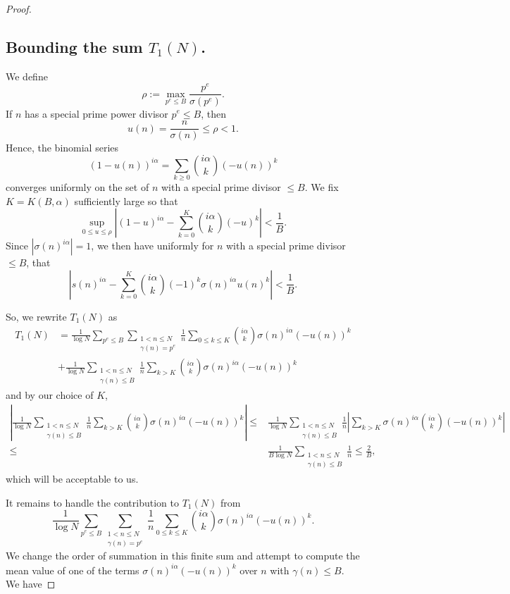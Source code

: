 \documentclass[11pt, reqno]{amsart}
\theoremstyle{remark}
\numberwithin{theorem}{section}
\numberwithin{proposition}{section}
\numberwithin{lemma}{section}
\numberwithin{corollary}{section}
\numberwithin{equation}{section}
\numberwithin{conjecture}{section}
\numberwithin{definition}{section}
\begin{document}
\begin{proof}
\subsection{Bounding the sum $T_1 (N)$.}

 We define
$$\rho := \max_{p^e\le B}
\frac{p^e}{\sigma(p^e)}.$$
If $n$ has a special prime power divisor $p^e\le B$, then $$u(n) = \frac{n}{\sigma(n)} \leq \rho < 1.$$ Hence, the binomial series $$(1 - u(n))^{i\alpha} = \sum_{k \geq 0} \binom{i\alpha}{k}(-u(n))^k$$ converges uniformly on the set of $n$ with a special prime divisor $\le B$. We fix $K = K(B, \alpha)$ sufficiently large so that $$\sup_{0\leq u \leq \rho}\left |(1 - u)^{i\alpha} - \sum_{k=0}^K \binom{i\alpha}{k}(-u)^k\right| < \frac{1}{B}.$$ Since $|\sigma(n)^{i\alpha}| =1$, we then have uniformly for $n$ with a special prime divisor $\le B$, that $$\left|s(n)^{i\alpha} - \sum_{k = 0}^K \binom{i\alpha}{k}(-1)^k\sigma(n)^{i\alpha}u(n)^k\right| < \frac{1}{B}.$$ 

So, we rewrite $T_1(N)$ as 
\begin{align*}
 T_1 (N)&= \frac{1}{\log N}\sum_{p^e\leq B}\sum_{\substack{1<n\leq N\\
 \gamma (n)=p^e }}\frac{1}{n}\sum_{0\leq k \leq K} \binom{i\alpha}{k}\sigma(n)^{i\alpha} (-u(n))^{k} \\&+ \frac{1}{\log N}\sum_{\substack{1<n\leq N\\
 \gamma (n)\le B }}\frac{1}{n}\sum_{k > K} \binom{i\alpha}{k}\sigma(n)^{i\alpha} (-u(n))^{k}
    \end{align*}
and by our choice of $K$,
\begin{align*}
   \left|\frac{1}{\log{N}}\sum_{\substack{1<n\leq N\\
   \gamma (n)\leqslant B}}\frac{1}{n}\sum_{k > K} \binom{i\alpha}{k}\sigma(n)^{i\alpha} (-u(n))^{k}\right|\leq& \frac{1}{\log{N}} \sum_{\substack{1<n\leq N\\
   \gamma (n)\leqslant B}}\frac{1}{n}\left|\sum_{k > K} \sigma(n)^{i\alpha}\binom{i\alpha}{k}(-u(n))^{k}\right|\\\le &\frac{1}{B \log{N}}\sum_{\substack{1<n\leq N\\
   \gamma (n) \leqslant B}} \frac{1}{n} \le \frac{2}{B},%
\end{align*}
which will be acceptable to us.

It remains to handle the contribution to $T_1(N)$ from
\begin{equation}\label{eq:tobeohof1}\frac{1}{\log N}\sum_{p^e\leq B}\sum_{\substack{1<n\leq N\\
 \gamma (n)=p^e }}\frac{1}{n}\sum_{0\leq k \leq K} \binom{i\alpha}{k}\sigma(n)^{i\alpha} (-u(n))^{k}.\end{equation}
We change the order of summation in this finite sum and attempt to compute the mean value of one of the terms $\sigma(n)^{i\alpha} (-u(n))^{k}$ over $n$ with $\gamma(n)\leq B$. We have
 

\end{proof}
\end{document}
